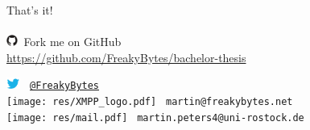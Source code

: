  
\begin{frame}{}{\mylogo}
	{\LARGE That's it!}\\[1.05em]
	\\[1.4em]
	
	\includegraphics[height=1em]{res/github.pdf}\ 
	Fork me on GitHub\\
	\textcolor{colorscheme}{\url{https://github.com/FreakyBytes/bachelor-thesis}}
	
	\includegraphics[height=1em]{res/twitter.png}
	\textcolor{colorscheme}{\tt\  \href{https://twitter.com/FreakyBytes}{@FreakyBytes}}\\
	
	\texttt{[image: res/XMPP\_logo.pdf]}
	\textcolor{colorscheme}{\tt\  martin@freakybytes.net}\\
	
	\texttt{[image: res/mail.pdf]}
	\textcolor{colorscheme}{\tt\  martin.peters4@uni-rostock.de} 
	
\end{frame}